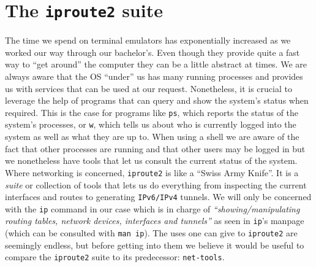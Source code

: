     \section{The \texttt{iproute2} suite}
        The time we spend on terminal emulators has exponentially increased as we worked our way through our bachelor's. Even though they provide quite a fast way to ``get around'' the computer they can be a little abstract at times. We are always aware that the OS ``under'' us has many running processes and provides us with services that can be used at our request. Nonetheless, it is crucial to leverage the help of programs that can query and show the system's status when required. This is the case for programs like \texttt{ps}, which reports the status of the system's processes, or \texttt{w}, which tells us about who is currently logged into the system as well as what they are up to. When using a shell we are aware of the fact that other processes are running and that other users may be logged in but we nonetheless have tools that let us consult the current status of the system.\\

        Where networking is concerned, \texttt{iproute2} is like a ``Swiss Army Knife''. It is a \textit{suite} or collection of tools that lets us do everything from inspecting the current interfaces and routes to generating \texttt{IPv6/IPv4} tunnels. We will only be concerned with the \texttt{ip} command in our case which is in charge of \textit{``showing/manipulating routing tables, network devices, interfaces and tunnels''} as seen in \texttt{ip}'s manpage (which can be consulted with \texttt{man ip}). The uses one can give to \texttt{iproute2} are seemingly endless, but before getting into them we believe it would be useful to compare the \texttt{iproute2} suite to its predecessor: \texttt{net-tools}.\\

